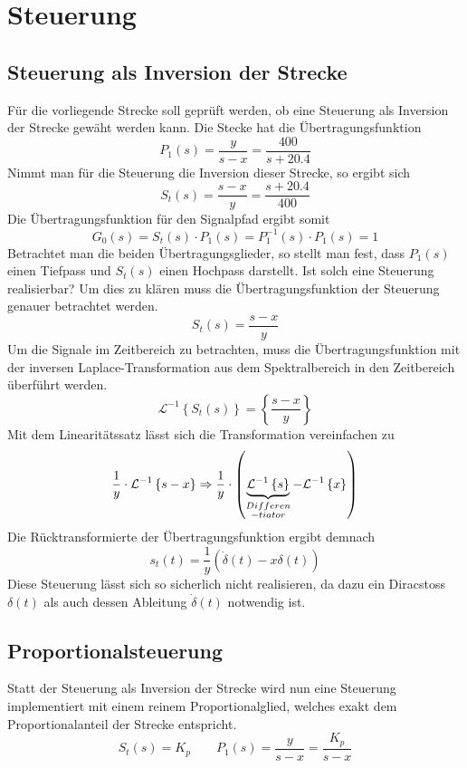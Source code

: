 \section{Steuerung}

\subsection{Steuerung als Inversion der Strecke}
Für die vorliegende Strecke soll geprüft werden, ob eine Steuerung als
Inversion der Strecke gewäht werden kann. Die Stecke hat die
Übertragungsfunktion
\[
	P_1(s) = \frac{y}{s-x} = \frac{400}{s + 20.4}
\]
Nimmt man für die Steuerung die Inversion dieser Strecke, so ergibt sich
\[
	S_t(s) = \frac{s-x}{y} = \frac{s + 20.4}{400}
\]
Die Übertragungsfunktion für den Signalpfad ergibt somit
\[
	G_0(s) = S_t(s) \cdot P_1(s) = P_1^{-1}(s) \cdot P_1(s) = 1
\]
Betrachtet man die beiden Übertragungsglieder, so stellt man fest, dass 
$P_1(s)$ einen Tiefpass und $S_t(s)$ einen Hochpass darstellt. Ist solch
eine Steuerung realisierbar? Um dies zu klären muss die Übertragungsfunktion
der Steuerung genauer betrachtet werden.
\[
	S_t(s) = \frac{s-x}{y}
\]
Um die Signale im Zeitbereich zu betrachten, muss die Übertragungsfunktion
mit der inversen Laplace-Transformation aus dem Spektralbereich in den
Zeitbereich überführt werden.
\[
	\mathcal{L}^{-1} \left\{ S_t(s) \right\}
	= \left\{ \frac{s-x}{y} \right\}
\]
Mit dem Linearitätssatz lässt sich die Transformation vereinfachen zu
\[
	\frac{1}{y} \cdot \mathcal{L}^{-1} \left\{ s-x \right\}
	\Rightarrow
	\frac{1}{y} \cdot \left(
		\underbrace{\mathcal{L}^{-1} \left\{ s \right\}}_{
			\begin{subarray}{c}Differen\\-tiator\end{subarray}}
		- \mathcal{L}^{-1} \left\{ x \right\}
	\right)
\]
Die Rücktransformierte der Übertragungsfunktion ergibt demnach
\[
	s_t(t) = \frac{1}{y} \left( \dot\delta(t) - x\delta(t) \right)
\]
Diese Steuerung lässt sich so sicherlich nicht realisieren, da dazu ein
Diracstoss $\delta(t)$ als auch dessen Ableitung $\dot\delta(t)$ notwendig
ist.

\subsection{Proportionalsteuerung}
Statt der Steuerung als Inversion der Strecke wird nun eine Steuerung
implementiert mit einem reinem Proportionalglied, welches exakt dem 
Proportionalanteil der Strecke entspricht.
\[
	S_t(s) = K_p \qquad  P_1(s) = \frac{y}{s-x} = \frac{K_p}{s-x}
\]

